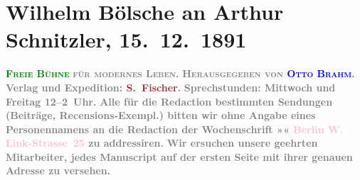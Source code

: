 

               \section[Wilhelm Bölsche an Arthur Schnitzler, 15. 12. 1891]{ Wilhelm Bölsche an Arthur Schnitzler, 15. 12. 1891}\nopagebreak{}\rehead{ }\normalsize\beginnumbering{} \toendnotes[C]{\smallbreak\pagebreak[2]} 
\toendnotes[C]{\smallbreak}\pstart
           \noindent{}\centering{}{\pb}\textcolor{gray}{\textbf{\textsc{\textcolor{green}{Freie Bühne}{}\ledrightnote{\textcolor{green}{Freie Bühne für modernes Leben}}}}}\pend
           \pstart
           \noindent{}\centering{}\textcolor{gray}{\textbf{\textsc{für modernes Leben.}}}\pend
           \pstart
           \noindent{}\centering{}\textcolor{gray}{\textbf{\textsc{Herausgegeben von \textcolor{blue}{\textbf{Otto Brahm}}{}\ledrightnote{\textcolor{blue}{Otto Brahm}}.}}}\pend
           \pstart
           \noindent{}\textcolor{gray}{\textbf{Verlag und Expedition: \textcolor{brown}{S. Fischer}{}\ledrightnote{\textcolor{brown}{S. Fischer Verlag}}.}}\pend
           \pstart
           \textcolor{gray}{\textbf{Sprechstunden: Mittwoch und Freitag 12–2 Uhr.}}\pend
           \pstart
           \textcolor{gray}{\textbf{Alle für die Redaction bestimmten Sendungen (Beiträge,
                            Recensions-Exempl.) bitten wir \textbf{ohne Angabe eines
                                Personennamens} an die Redaction der Wochenschrift »\textcolor{green}{}{}\ledrightnote{\textcolor{green}{Freie Bühne für modernes Leben}}« \textcolor{pink}{Berlin W. Link-Strasse 25}{}\ledrightnote{\textcolor{pink}{Linkstraße}} zu
                            addressiren.}}\pend
           \pstart
           \textcolor{gray}{\textbf{Wir ersuchen unsere geehrten Mitarbeiter, jedes
                            Manuscript auf der ersten Seite mit ihrer genauen Adresse zu
                            versehen.}}\pend
